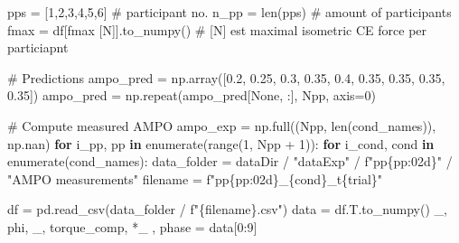 \documentclass[
  11pt,
  a4paper]{article}
\newenvironment{Shaded}{\begin{snugshade}}{\end{snugshade}}
\newcommand{\BuiltInTok}[1]{\textcolor[rgb]{0.00,0.23,0.31}{#1}}
\newcommand{\CommentTok}[1]{\textcolor[rgb]{0.37,0.37,0.37}{#1}}
\newcommand{\ControlFlowTok}[1]{\textcolor[rgb]{0.00,0.23,0.31}{\textbf{#1}}}
\newcommand{\DecValTok}[1]{\textcolor[rgb]{0.68,0.00,0.00}{#1}}
\newcommand{\FloatTok}[1]{\textcolor[rgb]{0.68,0.00,0.00}{#1}}
\newcommand{\KeywordTok}[1]{\textcolor[rgb]{0.00,0.23,0.31}{\textbf{#1}}}
\newcommand{\NormalTok}[1]{\textcolor[rgb]{0.00,0.23,0.31}{#1}}
\newcommand{\OperatorTok}[1]{\textcolor[rgb]{0.37,0.37,0.37}{#1}}
\newcommand{\SpecialCharTok}[1]{\textcolor[rgb]{0.37,0.37,0.37}{#1}}
\newcommand{\SpecialStringTok}[1]{\textcolor[rgb]{0.13,0.47,0.30}{#1}}
\newcommand{\StringTok}[1]{\textcolor[rgb]{0.13,0.47,0.30}{#1}}
\newcommand{\VariableTok}[1]{\textcolor[rgb]{0.07,0.07,0.07}{#1}}
\begin{document}
\begin{Shaded}
\begin{Highlighting}[]
\NormalTok{pps }\OperatorTok{=}\NormalTok{ [}\DecValTok{1}\NormalTok{,}\DecValTok{2}\NormalTok{,}\DecValTok{3}\NormalTok{,}\DecValTok{4}\NormalTok{,}\DecValTok{5}\NormalTok{,}\DecValTok{6}\NormalTok{] }\CommentTok{\# participant no.}
\NormalTok{n\_pp }\OperatorTok{=} \BuiltInTok{len}\NormalTok{(pps) }\CommentTok{\# amount of participants}
\NormalTok{fmax }\OperatorTok{=}\NormalTok{ df[}\StringTok{\textquotesingle{}fmax [N]\textquotesingle{}}\NormalTok{].to\_numpy() }\CommentTok{\# [N] est maximal isometric CE force per particiapnt}

\CommentTok{\# Predictions}
\NormalTok{ampo\_pred }\OperatorTok{=}\NormalTok{ np.array([}\FloatTok{0.2}\NormalTok{, }\FloatTok{0.25}\NormalTok{, }\FloatTok{0.3}\NormalTok{, }\FloatTok{0.35}\NormalTok{, }\FloatTok{0.4}\NormalTok{, }\FloatTok{0.35}\NormalTok{, }\FloatTok{0.35}\NormalTok{, }\FloatTok{0.35}\NormalTok{, }\FloatTok{0.35}\NormalTok{])}
\NormalTok{ampo\_pred }\OperatorTok{=}\NormalTok{ np.repeat(ampo\_pred[}\VariableTok{None}\NormalTok{, :], Npp, axis}\OperatorTok{=}\DecValTok{0}\NormalTok{)}

\CommentTok{\# Compute measured AMPO}
\NormalTok{ampo\_exp }\OperatorTok{=}\NormalTok{ np.full((Npp, }\BuiltInTok{len}\NormalTok{(cond\_names)), np.nan)}
\ControlFlowTok{for}\NormalTok{ i\_pp, pp }\KeywordTok{in} \BuiltInTok{enumerate}\NormalTok{(}\BuiltInTok{range}\NormalTok{(}\DecValTok{1}\NormalTok{, Npp }\OperatorTok{+} \DecValTok{1}\NormalTok{)):}
    \ControlFlowTok{for}\NormalTok{ i\_cond, cond }\KeywordTok{in} \BuiltInTok{enumerate}\NormalTok{(cond\_names):}
\NormalTok{        data\_folder }\OperatorTok{=}\NormalTok{ dataDir }\OperatorTok{/} \StringTok{"dataExp"} \OperatorTok{/} \SpecialStringTok{f"pp}\SpecialCharTok{\{}\NormalTok{pp}\SpecialCharTok{:02d\}}\SpecialStringTok{"} \OperatorTok{/} \StringTok{"AMPO measurements"}
\NormalTok{        filename }\OperatorTok{=} \SpecialStringTok{f"pp}\SpecialCharTok{\{}\NormalTok{pp}\SpecialCharTok{:02d\}}\SpecialStringTok{\_}\SpecialCharTok{\{}\NormalTok{cond}\SpecialCharTok{\}}\SpecialStringTok{\_t}\SpecialCharTok{\{}\NormalTok{trial}\SpecialCharTok{\}}\SpecialStringTok{"}

\NormalTok{        df }\OperatorTok{=}\NormalTok{ pd.read\_csv(data\_folder }\OperatorTok{/} \SpecialStringTok{f"}\SpecialCharTok{\{}\NormalTok{filename}\SpecialCharTok{\}}\SpecialStringTok{.csv"}\NormalTok{)}
\NormalTok{        data }\OperatorTok{=}\NormalTok{ df.T.to\_numpy()}
\NormalTok{        \_, phi, \_, torque\_comp, }\OperatorTok{*}\NormalTok{\_ , phase }\OperatorTok{=}\NormalTok{ data[}\DecValTok{0}\NormalTok{:}\DecValTok{9}\NormalTok{]}


\end{Highlighting}
\end{Shaded}
\end{document}
